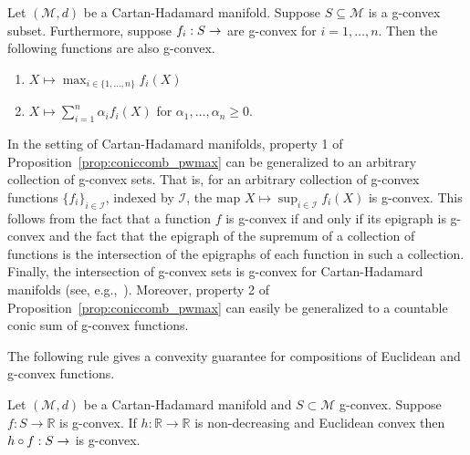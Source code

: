 \documentclass[twoside,11pt]{article}
\begin{document}
\begin{prop}\label{prop:coniccomb_pwmax}
    Let $(\mathcal{M}, d)$ be a Cartan-Hadamard manifold. Suppose $S \subseteq \mathcal{M}$ is a g-convex subset. Furthermore, suppose $f_i: S \to \real$ are g-convex for $i= 1, \ldots, n$. Then the following functions are also g-convex.
     \begin{enumerate}
        \item $X \mapsto \max_{i \in \{1,\ldots, n\}}f_i(X)$
        \item $X \mapsto \sum_{i=1}^n \alpha_i f_i(X) $ for $\alpha_1, \ldots, \alpha_n  \geq 0$.
    \end{enumerate}
\end{prop}

{
\begin{remark}
    In the setting of Cartan-Hadamard manifolds, property 1 of Proposition~\ref{prop:coniccomb_pwmax} can be generalized to an arbitrary collection of g-convex sets. That is, for an arbitrary collection of g-convex functions $\{f_i\}_{i \in\mathcal{I}}$, indexed by $\mathcal{I}$, the map $X \mapsto \sup_{i \in \mathcal{I}}f_i(X)$ is g-convex. This follows from the fact that a function $f$ is g-convex if and only if its epigraph is g-convex \citep{bacak2014convex} and the fact that the epigraph of the supremum of a collection of functions is the intersection of the epigraphs of each function in such a collection. Finally, the intersection of g-convex sets is g-convex for Cartan-Hadamard manifolds (see, e.g.,~\citep{boumal2020introduction}).
    Moreover, property 2 of Proposition~\ref{prop:coniccomb_pwmax} can easily be generalized to a countable conic sum of g-convex functions. 
\end{remark}
}

The following rule gives a convexity guarantee for compositions of Euclidean and g-convex functions. 
\begin{prop}\label{prop:ecvx_composition}
     Let $(\mathcal{M}, d)$ be a Cartan-Hadamard manifold and $S \subset \mathcal{M}$ g-convex. Suppose $f: S \rightarrow \mathbb{R}$ is g-convex. If $h: \mathbb{R} \rightarrow \mathbb{R}$ is non-decreasing and Euclidean convex then $h \circ f: S \to \real$ is g-convex.
\end{prop}
\end{document}
